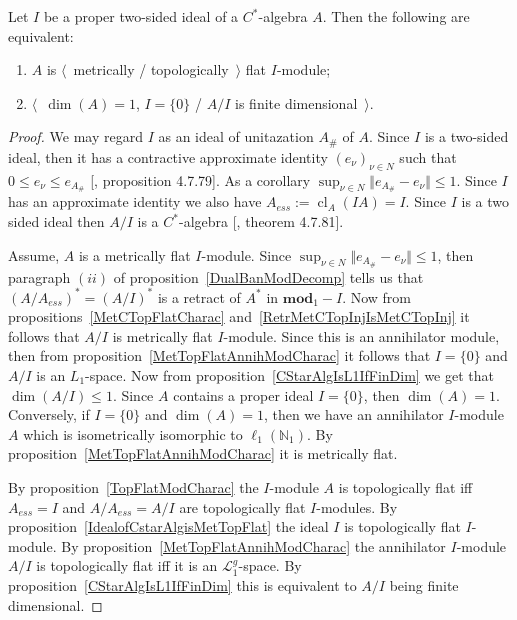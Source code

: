 \begin{proposition}\label{CStarAlgIsTopFlatOverItsIdeal} Let $I$ be a proper
two-sided ideal of a  $C^*$-algebra $A$. Then the following are equivalent:

\begin{enumerate}[label = (\roman*)]
    \item $A$ is $\langle$~metrically / topologically~$\rangle$ flat $I$-module;

    \item $\langle$~$\operatorname{dim}(A)=1$, $I= \{0 \}$ / $A/I$ is finite
    dimensional~$\rangle$.
\end{enumerate}
\end{proposition}
\begin{proof} We may regard $I$ as an  ideal of unitazation $A_\#$ of $A$. Since
$I$ is a two-sided ideal, then it has a contractive approximate identity
${(e_\nu)}_{\nu\in N}$ such that $0\leq e_\nu\leq e_{A_\#}$
[\cite{HelBanLocConvAlg}, proposition 4.7.79]. As a 
corollary $\sup_{\nu\in N}\Vert e_{A_\#}-e_\nu\Vert\leq 1$. Since $I$ has an 
approximate identity we also have $A_{ess}:=\operatorname{cl}_A(IA)=I$. 
Since $I$ is a two sided ideal then $A/I$ is a $C^*$-algebra 
[\cite{HelBanLocConvAlg}, theorem 4.7.81].

Assume, $A$ is a metrically flat $I$-module. Since 
$\sup_{\nu\in N}\Vert e_{A_\#}-e_\nu\Vert\leq 1$, then paragraph $(ii)$ of
proposition~\ref{DualBanModDecomp} tells us that ${(A/A_{ess})}^*={(A/I)}^*$ is 
a retract of $A^*$ in $\mathbf{mod}_1-I$. Now from
propositions~\ref{MetCTopFlatCharac} and~\ref{RetrMetCTopInjIsMetCTopInj} it
follows that $A/I$ is metrically flat $I$-module. Since this is an annihilator
module, then from proposition~\ref{MetTopFlatAnnihModCharac} it follows that 
$I= \{0 \}$ and $A/I$ is an $L_1$-space. Now from
proposition~\ref{CStarAlgIsL1IfFinDim} we get that 
$\operatorname{dim}(A/I)\leq 1$. Since $A$ contains a proper 
ideal $I= \{0 \}$, then $\operatorname{dim}(A)=1$. Conversely, 
if $I= \{0 \}$ and $\operatorname{dim}(A)=1$, then we have an 
annihilator $I$-module $A$ which is isometrically isomorphic 
to $\ell_1(\mathbb{N}_1)$. By proposition~\ref{MetTopFlatAnnihModCharac} 
it is metrically flat. 

By proposition~\ref{TopFlatModCharac} the $I$-module $A$ is topologically flat
iff $A_{ess}=I$ and $A/A_{ess}=A/I$ are topologically flat $I$-modules. By
proposition~\ref{IdealofCstarAlgisMetTopFlat} the ideal $I$ is topologically
flat $I$-module. By proposition~\ref{MetTopFlatAnnihModCharac} the annihilator
$I$-module $A/I$ is topologically flat iff it is an $\mathscr{L}_1^g$-space. By
proposition~\ref{CStarAlgIsL1IfFinDim} this is equivalent to $A/I$ being finite
dimensional.
\end{proof}

